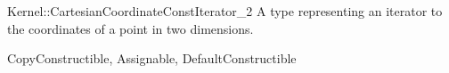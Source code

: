 \begin{ccRefConcept}{Kernel::CartesianCoordinateConstIterator_2}
A type representing an iterator to the  coordinates of a point
in two dimensions.

\ccRefines
CopyConstructible, Assignable, DefaultConstructible

\ccSeeAlso
{} \\

\end{ccRefConcept}
